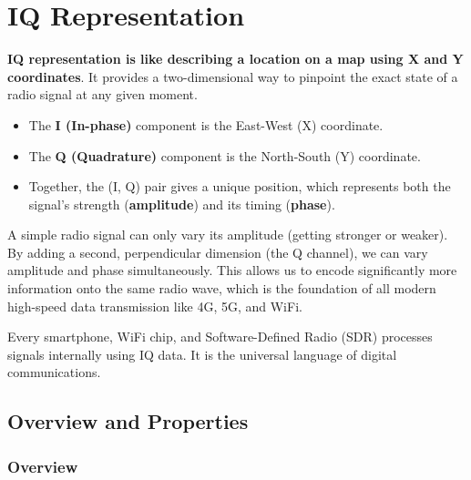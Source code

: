 
\chapter{IQ Representation}
\label{ch:iq}

\begin{nontechnical}
    \textbf{IQ representation is like describing a location on a map using X and Y coordinates}. It provides a two-dimensional way to pinpoint the exact state of a radio signal at any given moment.

    \begin{itemize}
        \item The \textbf{I (In-phase)} component is the East-West (X) coordinate.
        \item The \textbf{Q (Quadrature)} component is the North-South (Y) coordinate.
        \item Together, the (I, Q) pair gives a unique position, which represents both the signal's strength (\textbf{amplitude}) and its timing (\textbf{phase}).
    \end{itemize}

     A simple radio signal can only vary its amplitude (getting stronger or weaker). By adding a second, perpendicular dimension (the Q channel), we can vary amplitude and phase simultaneously. This allows us to encode significantly more information onto the same radio wave, which is the foundation of all modern high-speed data transmission like 4G, 5G, and WiFi.

     Every smartphone, WiFi chip, and Software-Defined Radio (SDR) processes signals internally using IQ data. It is the universal language of digital communications.
\end{nontechnical}


\section{Overview and Properties}

\subsection{Overview}

